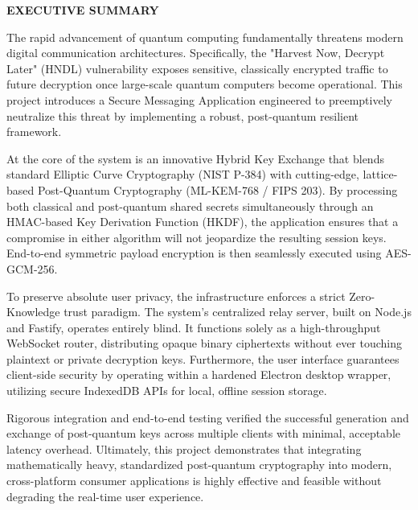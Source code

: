 \begin{center}
	\Large{\textbf{EXECUTIVE SUMMARY}}	
\end{center}
\vspace{1em}
\normalsize
\hspace{1cm} The rapid advancement of quantum computing fundamentally threatens modern digital communication architectures. Specifically, the "Harvest Now, Decrypt Later" (HNDL) vulnerability exposes sensitive, classically encrypted traffic to future decryption once large-scale quantum computers become operational. This project introduces a Secure Messaging Application engineered to preemptively neutralize this threat by implementing a robust, post-quantum resilient framework.

At the core of the system is an innovative Hybrid Key Exchange that blends standard Elliptic Curve Cryptography (NIST P-384) with cutting-edge, lattice-based Post-Quantum Cryptography (ML-KEM-768 / FIPS 203). By processing both classical and post-quantum shared secrets simultaneously through an HMAC-based Key Derivation Function (HKDF), the application ensures that a compromise in either algorithm will not jeopardize the resulting session keys. End-to-end symmetric payload encryption is then seamlessly executed using AES-GCM-256.

To preserve absolute user privacy, the infrastructure enforces a strict Zero-Knowledge trust paradigm. The system's centralized relay server, built on Node.js and Fastify, operates entirely blind. It functions solely as a high-throughput WebSocket router, distributing opaque binary ciphertexts without ever touching plaintext or private decryption keys. Furthermore, the user interface guarantees client-side security by operating within a hardened Electron desktop wrapper, utilizing secure IndexedDB APIs for local, offline session storage.

Rigorous integration and end-to-end testing verified the successful generation and exchange of post-quantum keys across multiple clients with minimal, acceptable latency overhead. Ultimately, this project demonstrates that integrating mathematically heavy, standardized post-quantum cryptography into modern, cross-platform consumer applications is highly effective and feasible without degrading the real-time user experience.
